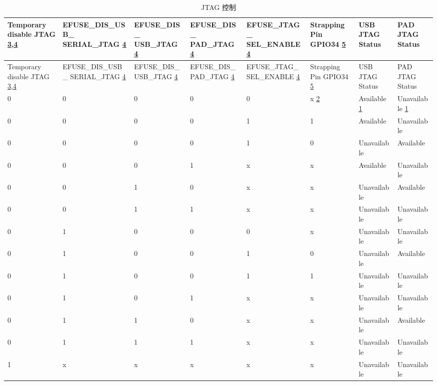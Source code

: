 \begin{longtable}{ | p{1.5cm} | p{2.6cm} | p{1.9cm} | p{1.9cm} | p{2.1cm} | p{1.4cm} | p{1.6cm} | p{1.6cm} | }
\caption{JTAG 控制} \label{tab:riscvcpu-jtag-control}\\
\hline\rowcolor{lightgray}
Temporary disable JTAG \hyperref[JTAG footnote: 3]{3},\hyperref[JTAG footnote: 4]{4} & EFUSE\_DIS\_USB\_ SERIAL\_JTAG \hyperref[JTAG footnote: 4]{4} & EFUSE\_DIS\_ USB\_JTAG \hyperref[JTAG footnote: 4]{4} & EFUSE\_DIS\_ PAD\_JTAG \hyperref[JTAG footnote: 4]{4} & EFUSE\_JTAG\_ SEL\_ENABLE \hyperref[JTAG footnote: 4]{4} & Strapping Pin GPIO34 \hyperref[JTAG footnote: 5]{5} & USB JTAG Status & PAD JTAG Status \\ \hline
\endfirsthead
\hline
\rowcolor{lightgray}
Temporary disable JTAG \hyperref[JTAG footnote: 3]{3},\hyperref[JTAG footnote: 4]{4} & EFUSE\_DIS\_USB\_ SERIAL\_JTAG \hyperref[JTAG footnote: 4]{4} & EFUSE\_DIS\_ USB\_JTAG \hyperref[JTAG footnote: 4]{4} & EFUSE\_DIS\_ PAD\_JTAG \hyperref[JTAG footnote: 4]{4} & EFUSE\_JTAG\_ SEL\_ENABLE \hyperref[JTAG footnote: 4]{4} & Strapping Pin GPIO34 \hyperref[JTAG footnote: 5]{5} & USB JTAG Status & PAD JTAG Status \\ \hline
\hline
\endhead
\endfoot

0 & 0 & 0 & 0 & 0 & x \hyperref[JTAG footnote: 2]{2}	& Available	 \hyperref[JTAG footnote: 1]{1}  &     Unavailable  \hyperref[JTAG footnote: 1]{1}  \\\hline
0 & 0 & 0 & 0 & 1 & 1	& Available	  &     Unavailable   \\\hline
0 & 0 & 0 & 0 & 1 & 0	& Unavailable & 	Available \\\hline
0 & 0 & 0 & 1 & x & x	& Available   & 	Unavailable \\\hline
0 & 0 & 1 & 0 & x & x	& Unavailable & 	Available \\\hline
0 & 0 & 1 & 1 & x & x	& Unavailable & 	Unavailable \\\hline
0 & 1 & 0 & 0 & 0 & x	& Unavailable & 	Unavailable \\\hline
0 & 1 & 0 & 0 & 1 & 0	& Unavailable & 	Available \\\hline
0 & 1 & 0 & 0 & 1 & 1	& Unavailable & 	Unavailable \\\hline
0 & 1 & 0 & 1 & x & x	& Unavailable & 	Unavailable \\\hline
0 & 1 & 1 & 0 & x & x	& Unavailable & 	Available \\\hline
0 & 1 & 1 & 1 & x & x	& Unavailable & 	Unavailable \\\hline
1 & x & x & x & x & x	& Unavailable & 	Unavailable \\\hline

\end{longtable}

